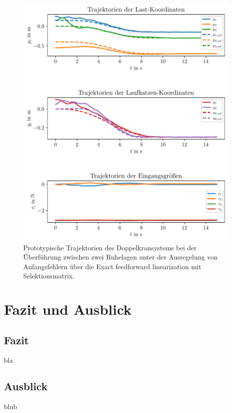\begin{figure}[ht]
	\begin{center}
		\includegraphics[scale=1]{Pictures/feedforward_lin_selec_controller_initial_error}
	\end{center}
	\caption[Trajektorien Ruhelagenüberführung mit Regelung über Exact feedforward linearization (Selektionsmatrix)]
	{Prototypische Trajektorien des Doppelkransystems bei der Überführung zwischen zwei Ruhelagen unter der Ausregelung von Anfangsfehlern über die Exact feedforward linearization mit Selektionsmatrix.}
	\label{fig_feedforward_selec_controller_initial_error}
\end{figure}

\chapter{Fazit und Ausblick}
\section{Fazit}
bla

\section{Ausblick}
blub

